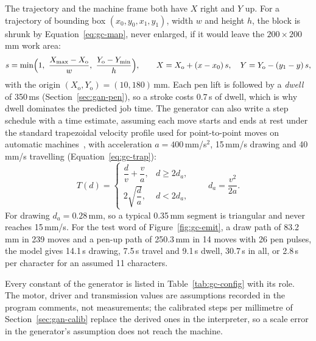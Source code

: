 The trajectory and the machine frame both have $X$ right and $Y$ up. For a trajectory of bounding box $(x_0,y_0,x_1,y_1)$, width $w$ and height $h$, the block is shrunk by Equation~\ref{eq:gc-map}, never enlarged, if it would leave the $200\times200$\,mm work area:
\begin{equation}
s=\min\Bigl(1,\ \frac{X_{\max}-X_{\mathrm o}}{w},\ \frac{Y_{\mathrm o}-Y_{\min}}{h}\Bigr),\qquad X=X_{\mathrm o}+(x-x_0)\,s,\quad Y=Y_{\mathrm o}-(y_1-y)\,s,
\label{eq:gc-map}
\end{equation}
with the origin $(X_{\mathrm o},Y_{\mathrm o})=(10,180)$\,mm. Each pen lift is followed by a \emph{dwell} of 350\,ms (Section~\ref{sec:gan-pen}), so a stroke costs 0.7\,s of dwell, which is why dwell dominates the predicted job time. The generator can also write a step schedule with a time estimate, assuming each move starts and ends at rest under the standard trapezoidal velocity profile used for point-to-point moves on automatic machines~\cite{biagiotti2008}, with acceleration $a=400$\,mm/s$^2$, 15\,mm/s drawing and 40\,mm/s travelling (Equation~\ref{eq:gc-trap}):
\begin{equation}
T(d)=\begin{cases}\dfrac{d}{v}+\dfrac{v}{a},&d\ge2d_a,\\[2mm]2\sqrt{\dfrac{d}{a}},&d<2d_a,\end{cases}\qquad d_a=\frac{v^2}{2a}.
\label{eq:gc-trap}
\end{equation}
For drawing $d_a=0.28$\,mm, so a typical 0.35\,mm segment is triangular and never reaches 15\,mm/s. For the test word of Figure~\ref{fig:gc-emit}, a draw path of 83.2\,mm in 239 moves and a pen-up path of 250.3\,mm in 14 moves with 26 pen pulses, the model gives 14.1\,s drawing, 7.5\,s travel and 9.1\,s dwell, 30.7\,s in all, or 2.8\,s per character for an assumed 11 characters.

Every constant of the generator is listed in Table~\ref{tab:gc-config} with its role.
The motor, driver and transmission values are assumptions recorded in the program comments, not measurements; the calibrated steps per millimetre of Section~\ref{sec:gan-calib} replace the derived ones in the interpreter, so a scale error in the generator's assumption does not reach the machine.


